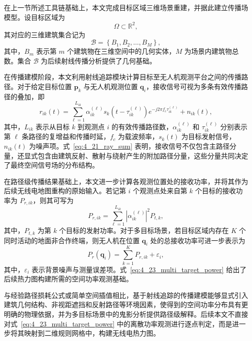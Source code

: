 在上一节所述工具链基础上，本文完成目标区域三维场景重建，并据此建立传播场模型。设目标区域为
\begin{equation}
\Omega \subset \mathbb{R}^2,
\label{eq:4_19_region}
\end{equation}
其对应的三维建筑集合记为
\begin{equation}
\mathcal{B}
=
\left\{
B_1,B_2,\ldots,B_M
\right\},
\label{eq:4_20_building_set}
\end{equation}
其中，\(B_m\) 表示第 \(m\) 个建筑物在三维空间中的几何实体，\(M\) 为场景内建筑物总数。集合 \(\mathcal{B}\) 为后续射线传播分析提供了几何基础。

在传播建模阶段，本文利用射线追踪模块计算目标至无人机观测平台之间的传播路径。对于给定目标位置 \(\mathbf{p}_k\) 与无人机观测位置 \(\mathbf{q}_i\)，接收信号可视为多条有效传播路径的叠加，即
\begin{equation}
r_{ik}(t)
=
\sum_{\ell=1}^{L_{ik}}
\alpha_{ik}^{(\ell)}
s_k\!\left(t-\tau_{ik}^{(\ell)}\right)
e^{-j2\pi f_c \tau_{ik}^{(\ell)}}
+
n_{ik}(t),
\label{eq:4_21_ray_sum}
\end{equation}
其中，\(L_{ik}\) 表示从目标 \(k\) 到观测点 \(i\) 的有效传播路径数，\(\alpha_{ik}^{(\ell)}\) 和 \(\tau_{ik}^{(\ell)}\) 分别表示第 \(\ell\) 条路径的复增益和传播时延，\(f_c\) 为载波频率，\(s_k(t)\) 为目标发射信号，\(n_{ik}(t)\) 为噪声项。式~\eqref{eq:4_21_ray_sum} 表明，接收信号不仅包含主路径分量，还显式包含由建筑反射、散射与绕射产生的附加路径分量，这些分量共同决定了最终空间信号场的分布结构。

在路径级传播结果基础上，本文进一步计算各观测位置处的接收功率，并将其作为后续无线电地图重构的原始输入。若记第 \(i\) 个观测点处来自第 \(k\) 个目标的接收功率为 \(P_{r,ik}\)，则其可写为
\begin{equation}
P_{r,ik}
=
\sum_{\ell=1}^{L_{ik}}
\left|
\alpha_{ik}^{(\ell)}
\right|^2
P_{t,k},
\label{eq:4_22_receive_power}
\end{equation}
其中，\(P_{t,k}\) 为第 \(k\) 个目标的发射功率。对于多目标场景，若目标区域内存在 \(K\) 个同时活动的地面非合作终端，则无人机在位置 \(\mathbf{q}_i\) 处的总接收功率可进一步表示为
\begin{equation}
P_r(\mathbf{q}_i)
=
\sum_{k=1}^{K} P_{r,ik}
+
\varepsilon_i,
\label{eq:4_23_multi_target_power}
\end{equation}
其中，\(\varepsilon_i\) 表示背景噪声与测量误差项。式~\eqref{eq:4_23_multi_target_power} 给出了后续热力图构建所需的空间功率观测基础。

与经验路径损耗公式或简单空间插值相比，基于射线追踪的传播建模能够显式引入建筑几何结构、非视距遮挡和反射路径等环境因素，使得到的空间功率分布具有更明确的物理依据，并为多目标场景中的鬼影分析提供路径级解释。后续本文不直接对式~\eqref{eq:4_23_multi_target_power} 中的离散功率观测进行逐点判定，而是进一步将其映射到二维规则网格中，构建无线电热力图。

